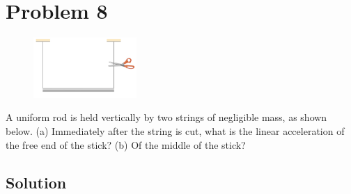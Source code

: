 \documentclass[12pt]{article}
\begin{document}
\section{Problem 8}
\begin{figure}
    \vspace{-30pt}
    \includegraphics[width=0.35\textwidth]{graph_8.png} 
\end{figure}
A uniform rod is held vertically by two strings of negligible mass, as shown below. (a) Immediately after the string is cut, what is the linear acceleration of the free end of the stick? (b) Of the middle of the stick?

\subsection{Solution}
\end{document}
